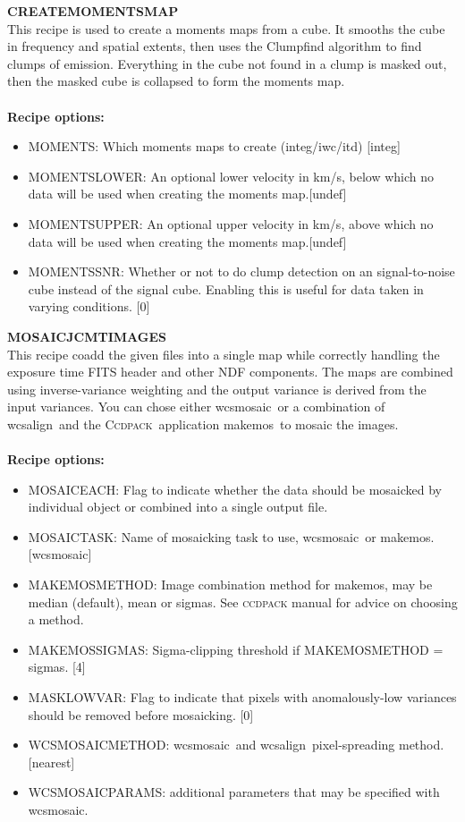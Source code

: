 \documentclass[twoside,11pt]{article}
\newcommand{\xref}[3]{#1}
\renewcommand{\_}{\texttt{\symbol{95}}}
\newcommand{\ccdpack}{\xref{\textsc{Ccdpack}}{sun139}{}}
\newcommand{\task}[1]{\textsf{#1}}
\newcommand{\wcsmosaic}{\xref{\task{wcsmosaic}}{sun95}{WCSMOSAIC}}
\newcommand{\wcsalign}{\xref{\task{wcsalign}}{sun95}{WCSALIGN}}
\newcommand{\makemos}{\xref{\task{makemos}}{sun139}{MAKEMOS}}
\begin{document}
\textbf{CREATE\_MOMENTS\_MAP}\\
This recipe is used to create a moments maps from a cube. It smooths the cube in frequency and spatial extents, then uses the Clumpfind algorithm to find clumps of emission. Everything in the cube not found in a clump is masked out, then the masked cube is collapsed to form the moments map.
\\\\
\textbf{Recipe options:}
\begin{itemize}
\item MOMENTS:  Which moments maps to create (integ/iwc/itd) [integ]
\item MOMENTS\_LOWER: An optional lower velocity in km/s, below which no data will be used when creating the moments map.[undef]
\item MOMENTS\_UPPER: An optional upper velocity in km/s, above which no data will be used when creating the moments map.[undef]
\item MOMENTS\_SNR: Whether or not to do clump detection on an signal-to-noise cube instead of the signal cube. Enabling this is useful for data taken in varying conditions. [0]
\end{itemize}

\textbf{MOSAIC\_JCMT\_IMAGES}\\
This recipe coadd the given files into a single map while correctly handling the exposure time FITS header and other NDF components. The maps are combined using inverse-variance weighting and the output variance is derived from the input variances. You can chose either \wcsmosaic\ or a combination of \wcsalign\ and the \ccdpack\ application \makemos\ to mosaic the images.
\\\\
\textbf{Recipe options:}
\begin{itemize}
\item MOSAIC\_EACH:  Flag to indicate whether the data should be mosaicked by individual object or combined into a single output file.
\item MOSAIC\_TASK: Name of mosaicking task to use, \wcsmosaic\ or \makemos. [wcsmosaic]
\item MAKEMOS\_METHOD: Image combination method for \makemos, may be median (default), mean or sigmas. See \xref{\textsc{ccdpack} manual}{sun139}{} for advice on choosing a method.
\item MAKEMOS\_SIGMAS: Sigma-clipping threshold if MAKEMOS\_METHOD = sigmas. [4]
\item MASK\_LOWVAR: Flag to indicate that pixels with anomalously-low variances should be removed before mosaicking. [0]
\item WCSMOSAIC\_METHOD: \wcsmosaic\ and \wcsalign\ pixel-spreading method. [nearest]
\item WCSMOSAIC\_PARAMS: additional parameters that may be specified with \wcsmosaic.
\end{itemize}
\end{document}
